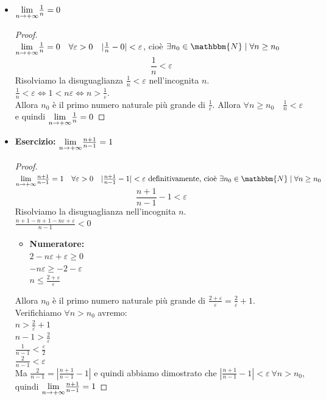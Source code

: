 \documentclass[12pt]{report}
\begin{document}
	\begin{itemize}
		\item $\mathlarger{\lim_{n \to +\infty}} \frac{1}{n} = 0$
		\begin{proof} \quad \\
			$\mathlarger{\lim_{n \to +\infty}} \frac{1}{n} = 0 \quad \forall \varepsilon > 0 \quad |\frac{1}{n} - 0| < \varepsilon$, cioè $\exists n_0 \in \mathbbm{N} \mid \forall n \geq n_0$
			\[
			\frac{1}{n} < \varepsilon
			\]
			Risolviamo la disuguaglianza $\frac{1}{n} < \varepsilon$ nell'incognita $n$. \\
			$\frac{1}{n} < \varepsilon \iff 1 < n\varepsilon \iff n > \frac{1}{\varepsilon}$. \\
			Allora $n_0$ è il primo numero naturale più grande di $\frac{1}{\varepsilon}$. Allora $\forall n \geq n_0 \quad \frac{1}{n} < \varepsilon$ e quindi $\mathlarger{\lim_{n \to +\infty}}\frac{1}{n}= 0$
		\end{proof}
		\item \textbf{Esercizio:} $\mathlarger{\lim_{n \to +\infty}} \frac{n + 1}{n - 1}=1$
		\begin{proof} \quad \\
			$\mathlarger{\lim_{n \to +\infty}}\frac{n+1}{n-1}=1 \quad \forall\varepsilon > 0 \quad |\frac{n+1}{n-1} - 1|<\varepsilon\ \text{definitivamente, cioè } \exists n_0 \in \mathbbm{N} \mid \forall n \geq n_0$
			\[
			\frac{n+1}{n-1} - 1 < \varepsilon
			\]
			Risolviamo la disuguaglianza nell'incognita $n$. \\
			$\frac{n + 1 -n + 1 - n\varepsilon + \varepsilon}{n - 1} < 0$ \\
			\begin{itemize}
				\item \textbf{Numeratore:} \\
				$2-n\varepsilon + \varepsilon \geq 0$ \\
				$-n\varepsilon \geq -2 - \varepsilon$ \\
				$n \leq \frac{2 + \varepsilon}{\varepsilon}$
			\end{itemize}
			Allora $n_0$ è il primo numero naturale più grande di $\frac{2 + \varepsilon}{\varepsilon} = \frac{2}{\varepsilon} + 1$. \\
			Verifichiamo $\forall n > n_0$ avremo: \\
			$n > \frac{2}{\varepsilon} + 1$ \\
			$n - 1 > \frac{2}{\varepsilon}$ \\
			$\frac{1}{n - 1} < \frac{\varepsilon}{2}$ \\
			$\frac{2}{n - 1} < \varepsilon$ \\
			Ma $\frac{2}{n-1} = |\frac{n+1}{n-1} - 1|$ e quindi abbiamo dimostrato che $|\frac{n+1}{n-1} - 1| < \varepsilon\ \forall n > n_0$, quindi $\mathlarger{\lim_{n \to +\infty}}\frac{n+1}{n-1}=1	$
		\end{proof}
	\end{itemize}
\end{document}
